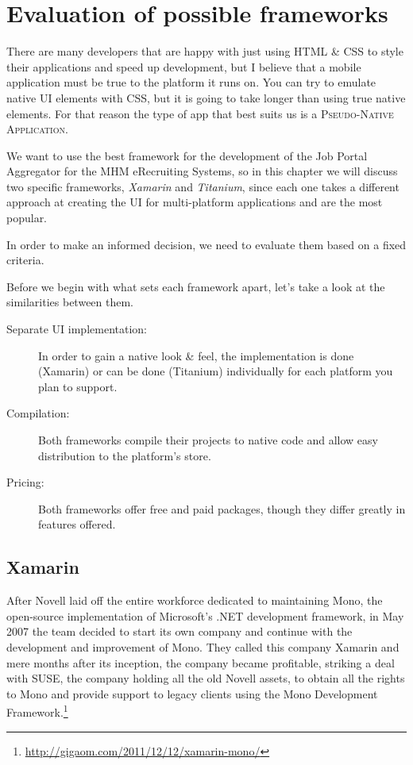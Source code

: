 \chapter{Evaluation of possible frameworks}\label{ch:evaluation}

There are many developers that are happy with just using HTML \& CSS to style their applications and speed up development, but I believe that a mobile application must be true to the platform it runs on. You can try to emulate native \ac{UI} elements with CSS, but it is going to take longer than using true native elements. For that reason the type of app that best suits us is a \textsc{Pseudo-Native Application}. 

We want to use the best framework for the development of the Job Portal Aggregator for the MHM eRecruiting Systems, so in this chapter we will discuss two specific frameworks, \emph{Xamarin} and \emph{Titanium}, since each one takes a different approach at creating the \ac{UI} for multi-platform applications and are the most popular.

In order to make an informed decision, we need to evaluate them based on a fixed criteria.

 

Before we begin with what sets each framework apart, let's take a look at the similarities between them.

\begin{description}
\item[Separate UI implementation:] In order to gain a native look \& feel, the implementation is done (Xamarin) or can be done (Titanium) individually for each platform you plan to support.
\item[Compilation:] Both frameworks compile their projects to native code and allow easy distribution to the platform's store.
\item[Pricing:] Both frameworks offer free and paid packages, though they differ greatly in features offered.   
\end{description}


\section{Xamarin}
After Novell laid off the entire workforce dedicated to maintaining Mono, the open-source implementation of Microsoft’s .NET development framework, in May 2007 the team decided to start its own company and continue with the development and improvement of Mono. They called this company Xamarin and mere months after its inception, the company became profitable, striking a deal with SUSE, the company holding all the old Novell assets, to obtain all the rights to Mono and provide support to legacy clients using the Mono Development Framework.\footnote{\url{http://gigaom.com/2011/12/12/xamarin-mono/}}

